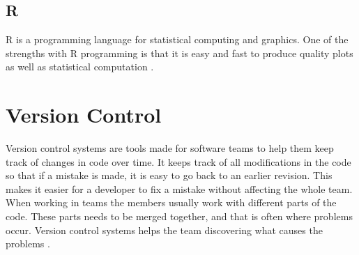 \documentclass[english, a4paper]{report}
\begin{document}
{{        \subsection{R}\label{Rtheory}
        {
            R is a programming language for statistical computing and graphics. One of the strengths with R programming is that it is easy and fast to produce quality plots as well as statistical computation \cite{rprog}. 
        }
    }
    
    \section{Version Control}
    {
        Version control systems are tools made for software teams to help them keep track of changes in code over time. It keeps track of all modifications in the code so that if a mistake is made, it is easy to go back to an earlier revision. This makes it easier for a developer to fix a mistake without affecting the whole team. When working in teams the members usually work with different parts of the code. These parts needs to be merged together, and that is often where problems occur. Version control systems helps the team discovering what causes the problems \cite{versionControl}. 
    }
}

\newpage
\end{document}
